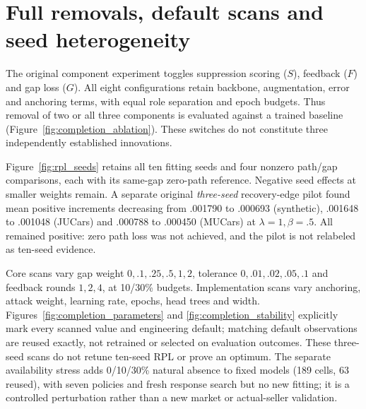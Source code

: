 \documentclass[11pt]{article}
\begin{document}
\section{Full removals, default scans and seed heterogeneity}\label{app:extended}
The original component experiment toggles suppression scoring ($S$), feedback
($F$) and gap loss ($G$). All eight configurations retain backbone,
augmentation, error and anchoring terms, with equal role separation and epoch
budgets. Thus removal of two or all three components is evaluated against a
trained baseline (Figure~\ref{fig:completion_ablation}). These switches do
not constitute three independently established innovations.

Figure~\ref{fig:rpl_seeds} retains all ten fitting seeds and four nonzero
path/gap comparisons, each with its same-gap zero-path reference. Negative
seed effects at smaller weights remain. A separate original \emph{three-seed}
recovery-edge pilot found mean positive increments decreasing from .001790
to .000693 (synthetic), .001648 to .001048 (JUCars) and .000788 to .000450
(MUCars) at $\lambda=1,\beta=.5$. All remained positive: zero path loss was
not achieved, and the pilot is not relabeled as ten-seed evidence.

Core scans vary gap weight $0,.1,.25,.5,1,2$, tolerance
$0,.01,.02,.05,.1$ and feedback rounds $1,2,4$, at 10/30\% budgets.
Implementation scans vary anchoring, attack weight, learning rate, epochs,
head trees and width. Figures~\ref{fig:completion_parameters} and
\ref{fig:completion_stability} explicitly mark every scanned value and
engineering default; matching default observations are reused exactly, not
retrained or selected on evaluation outcomes. These three-seed scans do not
retune ten-seed RPL or prove an optimum. The separate availability stress
adds 0/10/30\% natural absence to fixed models (189 cells, 63 reused), with
seven policies and fresh response search but no new fitting; it is a controlled
perturbation rather than a new market or actual-seller validation.
\end{document}
